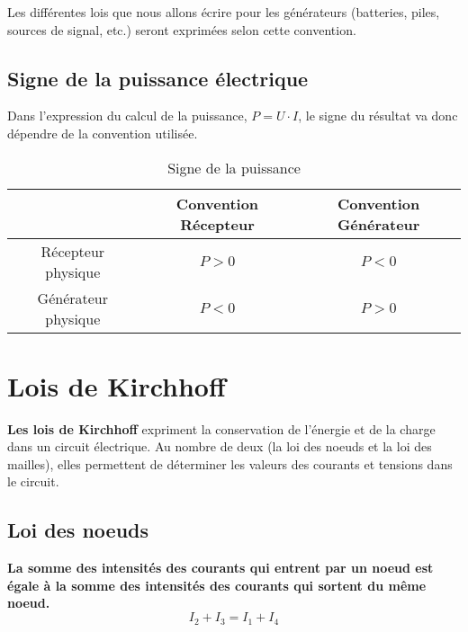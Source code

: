 Les différentes lois que nous allons écrire pour les générateurs (batteries, piles, sources de signal, etc.) seront exprimées selon cette convention.

\subsection*{Signe de la puissance électrique}

Dans l'expression du calcul de la puissance, $P=U \cdot I$, le signe du résultat va donc dépendre de la convention utilisée.

\begin{table}[!h]
\begin{center}
\bgroup
\def\arraystretch{1.5}%
\begin{tabular}{|c|c|c|}
	\hline
	& \textbf{Convention Récepteur} & \textbf{Convention Générateur} \\
	\hline
	Récepteur physique  & $P>0$ & $P<0$ \\
	\hline
	Générateur physique & $P<0$ & $P>0$ \\
	\hline
\end{tabular}
\egroup
\end{center}
	\caption{ Signe de la puissance }
\end{table}

\section{Lois de Kirchhoff}
\textbf{Les lois de Kirchhoff} expriment la conservation de l'énergie et de la charge dans un circuit électrique. Au nombre de deux (la loi des noeuds et la loi des mailles), elles permettent de déterminer les valeurs des courants et tensions dans le circuit.

\subsection*{Loi des noeuds}
\vspace{0.5cm}
\begin{minipage}{3cm}
\begin{center}

\end{center}
\end{minipage}
\hspace{1cm}
\begin{minipage}{10cm} 
\textbf{La somme des intensités des courants qui entrent par un noeud est égale à la somme des intensités des courants qui sortent du même noeud.} \\
	$$ I_2 + I_3 = I_1 + I_4 $$
\end{minipage}\\

